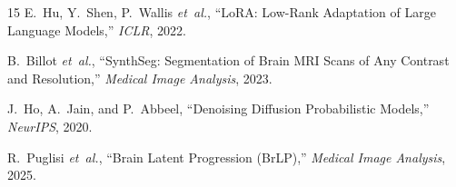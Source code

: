 \documentclass[11pt,a4paper]{article}
\newcommand{\etal}{\textit{et~al.}}
\begin{document}
\begin{thebibliography}{15}
E.~Hu, Y.~Shen, P.~Wallis \etal,
``LoRA: Low-Rank Adaptation of Large Language Models,''
\emph{ICLR}, 2022.

B.~Billot \etal,
``SynthSeg: Segmentation of Brain MRI Scans of Any Contrast and Resolution,''
\emph{Medical Image Analysis}, 2023.

J.~Ho, A.~Jain, and P.~Abbeel,
``Denoising Diffusion Probabilistic Models,''
\emph{NeurIPS}, 2020.

R.~Puglisi \etal,
``Brain Latent Progression (BrLP),''
\emph{Medical Image Analysis}, 2025.

\end{thebibliography}
\endgroup
\end{document}
